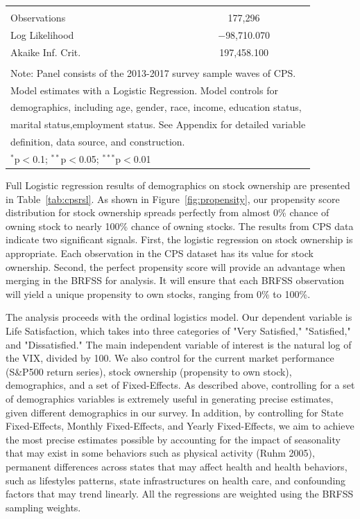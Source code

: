 \documentclass[11pt,a4paper,oldfontcommands]{memoir}
\begin{document}
{\begin{small}
\begin{longtable}[c]{lc}
\hline \\[-1.8ex] 
Observations & 177,296 \\ 
Log Likelihood & $-$98,710.070 \\ 
Akaike Inf. Crit. & 197,458.100 \\ 
\hline 
\hline \\[-1.8ex] 
\multicolumn{2}{l}{Note: Panel consists of the 2013-2017 survey sample waves of CPS.}\\
\multicolumn{2}{l}{Model estimates with a Logistic Regression. Model controls for}\\
\multicolumn{2}{l}{demographics, including age, gender, race, income, education status,}\\
\multicolumn{2}{l}{marital status,employment status.  See Appendix for detailed variable}\\
\multicolumn{2}{l}{definition, data source, and construction.}\\
\multicolumn{2}{l}{ $^{*}$p$<$0.1; $^{**}$p$<$0.05; $^{***}$p$<$0.01} \\ 
\hline\hline
\end{longtable}
\end{small}

Full Logistic regression results of demographics on stock ownership are presented in Table~\ref{tab:cpsrsl}. As shown in Figure~\ref{fig:propensity}, our propensity score distribution for stock ownership spreads perfectly from almost 0\% chance of owning stock to nearly 100\% chance of owning stocks. The results from CPS data indicate two significant signals. First, the logistic regression on stock ownership is appropriate. Each observation in the CPS dataset has its value for stock ownership. Second, the perfect propensity score will provide an advantage when merging in the BRFSS for analysis. It will ensure that each BRFSS observation will yield a unique propensity to own stocks, ranging from 0\% to 100\%. 

The analysis proceeds with the ordinal logistics model. Our dependent variable is Life Satisfaction, which takes into three categories of "Very Satisfied," "Satisfied," and "Dissatisfied." The main independent variable of interest is the natural log of the VIX, divided by 100. We also control for the current market performance (S&P500 return series), stock ownership (propensity to own stock), demographics, and a set of Fixed-Effects. As described above, controlling for a set of demographics variables is extremely useful in generating precise estimates, given different demographics in our survey. In addition, by controlling for State Fixed-Effects, Monthly Fixed-Effects, and Yearly Fixed-Effects, we aim to achieve the most precise estimates possible by accounting for the impact of seasonality that may exist in some behaviors such as physical activity (Ruhm 2005), permanent differences across states that may affect health and health behaviors, such as lifestyles patterns, state infrastructures on health care, and confounding factors that may trend linearly. All the regressions are weighted using the BRFSS sampling weights.

}
\end{document}
